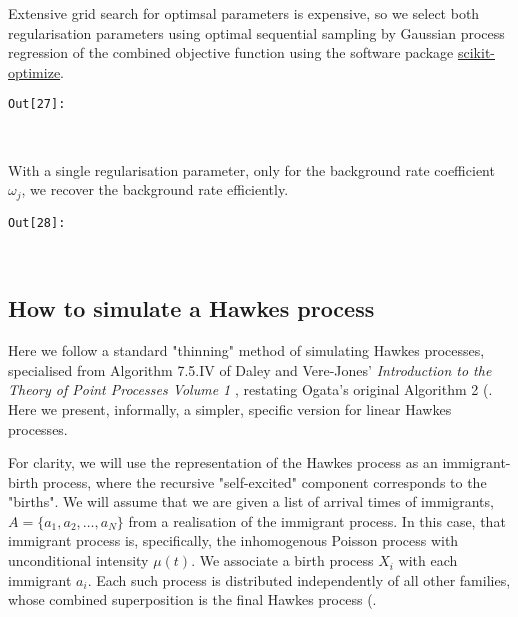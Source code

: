\documentclass[11pt]{article}
\begin{document}
    Extensive grid search for optimsal parameters is expensive, so we select
both regularisation parameters using optimal sequential sampling by
Gaussian process regression of the combined objective function
\cite{snoek_practical_2012} using the software package
\href{https://github.com/scikit-optimize/scikit-optimize}{scikit-optimize}.


\texttt{\color{outcolor}Out[{\color{outcolor}27}]:}
    
    \begin{center}
    \end{center}
    { \hspace*{\fill} \\}
    

    With a single regularisation parameter, only for the background rate
coefficient \(\omega_j\), we recover the background rate efficiently.


\texttt{\color{outcolor}Out[{\color{outcolor}28}]:}
    
    \begin{center}
    \end{center}
    { \hspace*{\fill} \\}
    

    \subsection{How to simulate a Hawkes
process}\label{how-to-simulate-a-hawkes-process}

Here we follow a standard "thinning" method of simulating Hawkes
processes, specialised from Algorithm 7.5.IV of Daley and Vere-Jones'
\emph{Introduction to the Theory of Point Processes Volume 1}
\cite{daley_introduction_2003}, restating Ogata's original Algorithm 2
(\cite{ogata_lewis_1981}. Here we present, informally, a simpler,
specific version for linear Hawkes processes.

For clarity, we will use the representation of the Hawkes process as an
immigrant-birth process, where the recursive "self-excited" component
corresponds to the "births". We will assume that we are given a list of
arrival times of immigrants, \(A=\{a_1,a_2,\dots,a_N\}\) from a
realisation of the immigrant process. In this case, that immigrant
process is, specifically, the inhomogenous Poisson process with
unconditional intensity \(\mu(t)\). We associate a birth process \(X_i\)
with each immigrant \(a_i\). Each such process is distributed
independently of all other families, whose combined superposition is the
final Hawkes process (\cite{hawkes_cluster_1974}.
\end{document}

